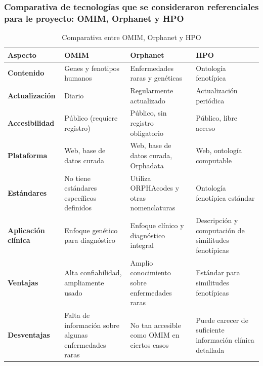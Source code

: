 \documentclass{article}
\begin{document}
\subsubsection*{Comparativa de tecnologías que se consideraron referenciales para le proyecto: OMIM, Orphanet y HPO}

\begin{table}[H]
\centering
\caption{Comparativa entre OMIM, Orphanet y HPO}
\renewcommand{\arraystretch}{1.5} %
\begin{tabular}{|p{3.5cm}|p{3.5cm}|p{3.5cm}|p{3.5cm}|}
\hline
\textbf{Aspecto}           & \textbf{OMIM}                              & \textbf{Orphanet}                         & \textbf{HPO}                           \\ \hline
\textbf{Contenido}          & Genes y fenotipos humanos                  & Enfermedades raras y genéticas            & Ontología fenotípica                   \\ \hline
\textbf{Actualización}      & Diario                                    & Regularmente actualizado                  & Actualización periódica                 \\ \hline
\textbf{Accesibilidad}      & Público (requiere registro)                & Público, sin registro obligatorio         & Público, libre acceso                   \\ \hline
\textbf{Plataforma}         & Web, base de datos curada                 & Web, base de datos curada, Orphadata      & Web, ontología computable               \\ \hline
\textbf{Estándares}         & No tiene estándares específicos definidos  & Utiliza ORPHAcodes y otras nomenclaturas   & Ontología fenotípica estándar           \\ \hline
\textbf{Aplicación clínica} & Enfoque genético para diagnóstico          & Enfoque clínico y diagnóstico integral    & Descripción y computación de similitudes fenotípicas \\ \hline
\textbf{Ventajas}           & Alta confiabilidad, ampliamente usado      & Amplio conocimiento sobre enfermedades raras  & Estándar para similitudes fenotípicas  \\ \hline
\textbf{Desventajas}        & Falta de información sobre algunas enfermedades raras  & No tan accesible como OMIM en ciertos casos    & Puede carecer de suficiente información clínica detallada \\ \hline
\end{tabular}
\end{table}
\end{document}
